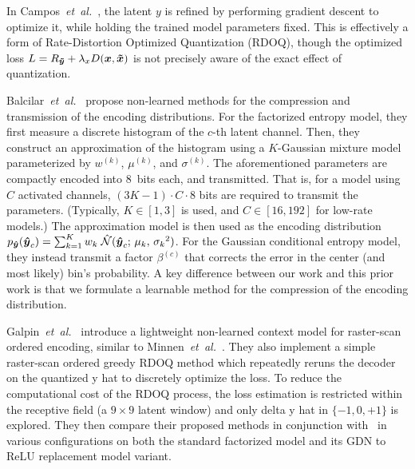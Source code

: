 In Campos~\emph{et~al.}~\cite{campos2019content}, the latent $y$ is refined by performing gradient descent to optimize it, while holding the trained model parameters fixed.
This is effectively a form of Rate-Distortion Optimized Quantization (RDOQ), though the optimized loss
$L = R_{{\boldsymbol{\tilde{y}}}} + \lambda_x D({\boldsymbol{x}}, {\boldsymbol{\tilde{x}}})$
is not precisely aware of the exact effect of quantization.  %

Balcilar~\emph{et~al.}~\cite{balcilar2022amortizationgap} propose non-learned methods for the compression and transmission of the encoding distributions.
For the factorized entropy model, they first measure a discrete histogram of the $c$-th latent channel.
Then, they construct an approximation of the histogram using a $K$-Gaussian mixture model parameterized by $w^{(k)}$, $\mu^{(k)}$, and $\sigma^{(k)}$.
The aforementioned parameters are compactly encoded into 8~bits each, and transmitted.
That is, for a model using $C$ activated channels, $(3K - 1) \cdot C \cdot 8$ bits are required to transmit the parameters.
(Typically, $K \in [1, 3]$ is used, and $C \in [16, 192]$ for low-rate models.)
The approximation model is then used as the encoding distribution %
$p_{{\boldsymbol{\hat{y}}}}({\boldsymbol{\hat{y}}}_c) = \sum_{k=1}^K w_k \; \mathcal{\hat{N}}({\boldsymbol{\hat{y}}}_c ; \, \mu_k, \, {\sigma_k}^2)$.
For the Gaussian conditional entropy model, they instead transmit a factor $\beta^{(c)}$ that corrects the error in the center (and most likely) bin's probability.
A key difference between our work and this prior work is that we formulate a learnable method for the compression of the encoding distribution.

Galpin~\emph{et~al.}~\cite{galpin2023entropy} introduce a lightweight non-learned context model for raster-scan ordered encoding, similar to Minnen~\emph{et~al.}~\cite{minnen2018joint}.
They also implement a simple raster-scan ordered greedy RDOQ method which repeatedly reruns the decoder on the quantized y hat to discretely optimize the loss.
To reduce the computational cost of the RDOQ process, the loss estimation is restricted within the receptive field (a $9 \times 9$ latent window) and only delta y hat in $\{-1, 0, +1\}$ is explored.
They then compare their proposed methods in conjunction with~\cite{campos2019content,balcilar2022amortizationgap} in various configurations on both the standard factorized model and its GDN to ReLU replacement model variant.




